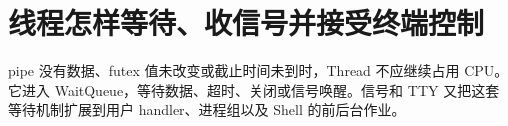 \chapter{线程怎样等待、收信号并接受终端控制}

pipe 没有数据、futex 值未改变或截止时间未到时，Thread 不应继续占用 CPU。
它进入 WaitQueue，等待数据、超时、关闭或信号唤醒。信号和 TTY 又把这套
等待机制扩展到用户 handler、进程组以及 Shell 的前后台作业。










